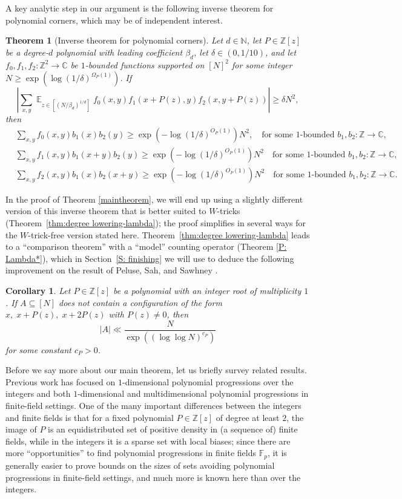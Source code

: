 \documentclass[11pt]{amsart}
\newtheorem{theorem}[lemma]{Theorem}
\newtheorem{corollary}[lemma]{Corollary}
\theoremstyle{definition}
\DeclareMathOperator*{\E}{\mathbb{E}}
\newcommand{\C}{{\mathbb C}}
\newcommand{\N}{{\mathbb N}}
\newcommand{\Z}{{\mathbb Z}}
\newcommand{\abs}[1]{\mathopen{}\left| #1\mathclose{}\right|}
\begin{document}
A key analytic step in our argument is the following inverse theorem for polynomial corners, which may be of independent interest. 
\begin{theorem}[{Inverse theorem for polynomial corners}]\label{thm:non-w-tricked-degree lowering-lambda}
Let $d\in\N$, let $P\in\Z[z]$ be a degree-$d$ polynomial with leading coefficient $\beta_d$, let $\delta\in(0, 1/10)$, and let $f_0, f_1, f_2: \Z^2 \to \mathbb{C}$ be $1$-bounded functions supported on $[N]^2$ for some integer $N \geq \exp(\log(1/\delta)^{\Omega_P(1)})$. If
$$\abs{\sum_{x,y}\E_{z\in[(N/\beta_d)^{1/d}]}f_0(x,y)f_1(x+P(z), y) f_2(x, y + P(z))} \geq \delta N^2,$$
then
\begin{align*}
    &\sum_{x,y}f_0(x,y)b_1(x)b_2(y) \geq \exp(-\log(1/\delta)^{O_P(1)}) N^2,\quad \text{for some $1$-bounded $b_1,b_2: \Z \to \C$},\\
    &\sum_{x,y}f_1(x,y)b_1(x+y)b_2(y) \geq \exp(-\log(1/\delta)^{O_P(1)}) N^2\quad \text{for some $1$-bounded $b_1,b_2: \Z \to \C$},\\
    &\sum_{x,y}f_2(x,y)b_1(x)b_2(x+y) \geq \exp(-\log(1/\delta)^{O_P(1)}) N^2\quad \text{for some $1$-bounded $b_1,b_2: \Z \to \C$}.
\end{align*}
\end{theorem}
In the proof of Theorem \ref{maintheorem}, we will end up using a slightly different version of this inverse theorem that is better suited to $W$-tricks (Theorem~\ref{thm:degree lowering-lambda}); the proof simplifies in several ways for the $W$-trick-free version stated here.  Theorem~\ref{thm:degree lowering-lambda} leads to a ``comparison theorem'' with a ``model'' counting operator (Theorem \ref{P: Lambda*}), which in Section~\ref{S: finishing} we will use to deduce the following improvement on the result of Peluse, Sah, and Sawhney \cite{PSS23}.

\begin{corollary}\label{cor: PSS improvement}
Let $P \in \mathbb{Z}[z]$ be a polynomial with an integer root of multiplicity $1$. If $A \subseteq [N]$ does not contain a configuration of the form $x,\; x + P(z),\; x + 2P(z)$ with $P(z) \neq 0$, then
$$|A| \ll \frac{N}{\exp((\log\log N)^{c_P})}$$
for some constant $c_P > 0$.
\end{corollary}

Before we say more about our main theorem, let us briefly survey related results.  Previous work has focused on $1$-dimensional polynomial progressions over the integers and both $1$-dimensional and multidimensional polynomial progressions in finite-field settings.  One of the many important differences between the integers and finite fields is that for a fixed polynomial $P \in \Z[z]$ of degree at least $2$, the image of $P$ is an equidistributed set of positive density in (a sequence of) finite fields, while in the integers it is a sparse set with local biases; since there are more ``opportunities'' to find polynomial progressions in finite fields $\mathbb{F}_p$, it is generally easier to prove bounds on the sizes of sets avoiding polynomial progressions in finite-field settings, and much more is known here than over the integers.
\end{document}
